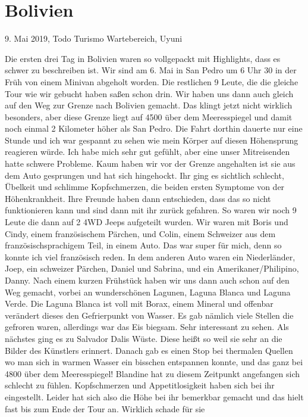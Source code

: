 \documentclass[11pt]{book}
\begin{document}
\chapter{Bolivien}

9. Mai 2019, Todo Turismo Wartebereich, Uyuni

Die ersten drei Tag in Bolivien waren so vollgepackt mit Highlights, dass es schwer zu beschreiben ist. Wir sind am 6. Mai in San Pedro um 6 Uhr 30 
in der Früh von einem Minivan abgeholt worden. Die restlichen 9 Leute, die die gleiche Tour wie wir gebucht haben saßen schon drin. Wir haben uns 
dann auch gleich auf den Weg zur Grenze nach Bolivien gemacht. Das klingt jetzt nicht wirklich besonders, aber diese Grenze liegt auf 4500 über dem 
Meeresspiegel und damit noch einmal 2 Kilometer höher als San Pedro. Die Fahrt dorthin dauerte nur eine Stunde und ich war gespannt zu sehen wie mein 
Körper auf diesen Höhensprung reagieren würde. Ich habe mich sehr gut gefühlt, aber eine unser Mitreisenden hatte schwere Probleme. Kaum haben wir vor 
der Grenze angehalten ist sie aus dem Auto gesprungen und hat sich hingehockt. Ihr ging es sichtlich schlecht, Übelkeit und schlimme Kopfschmerzen, die 
beiden ersten Symptome von der Höhenkrankheit. Ihre Freunde haben dann entschieden, dass das so nicht funktionieren kann und sind dann mit ihr zurück 
gefahren. So waren wir noch 9 Leute die dann auf 2 4WD Jeeps aufgeteilt wurden. Wir waren mit Boris und Cindy, einem französischem Pärchen, und Colin, 
einem Schweizer aus dem französischsprachigem Teil, in einem Auto. Das war super für mich, denn so konnte ich viel französisch reden. In dem anderen 
Auto waren ein Niederländer, Joep, ein schweizer Pärchen, Daniel und Sabrina, und ein Amerikaner/Philipino, Danny. Nach einem kurzen Frühstück haben 
wir uns dann auch schon auf den Weg gemacht, vorbei an wunderschönen Lagunen, Laguna Blanca und Laguna Verde. Die Laguna Blanca ist voll mit Borax, 
einem Mineral und offenbar verändert dieses den Gefrierpunkt von Wasser. Es gab nämlich viele Stellen die gefroren waren, allerdings war das Eis 
biegsam. Sehr interessant zu sehen. Als nächstes ging es zu Salvador Dalis Wüste. Diese heißt so weil sie sehr an die Bilder des Künstlers erinnert. 
Danach gab es einen Stop bei thermalen Quellen wo man sich in warmen Wasser ein bisschen entspannen konnte, und das 
ganz bei 4800 über dem Meeresspiegel! Blandine hat zu diesem Zeitpunkt angefangen sich schlecht zu fühlen. Kopfschmerzen und Appetitlosigkeit haben 
sich bei ihr eingestellt. Leider hat sich also die Höhe bei ihr bemerkbar gemacht und das hielt fast bis zum Ende der Tour an. Wirklich schade für sie 
\end{document}
